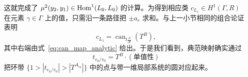 这就完成了 $\mu^2(y_2,y_1)\in\operatorname{Hom}^1(L_0,L_0)$ 的计算。为得到相应类 $c_{L_1}\in H^1(\Gamma,R)$ 在元素 $\gamma\in\Gamma$ 上的值，只需沿一条路径把 $\pm a_{e}$ 求和。与上一小节相同的组合论证表明
\[
c_{L_1}=\operatorname{can}_{t\frac{\partial}{\partial t}}(T^B),
\]
其中右端由式~\eqref{eq:can_map_analytic} 给出。于是我们看到，典范映射确实通过
\[
t_{e_0/v_0}=T^{B}\cdot(\text{单值性})
\]
把环带 $\{1>|t_{e_0/v_0}|>|T^{A_{e_0}}|\}$ 中的点与带一维局部系统的圆对应起来。
